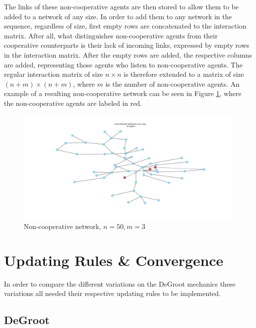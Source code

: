 \documentclass[a4paper, 12pt]{report}
\begin{document}
\noindent The links of these non-cooperative agents are then stored to allow them to be added to a network of any size. In order to add them to any network in the sequence, regardless of size, first empty rows are concatenated to the interaction matrix. After all, what distinguishes non-cooperative agents from their cooperative counterparts is their lack of incoming links, expressed by empty rows in the interaction matrix. After the empty rows are added, the respective columns are added, representing those agents who listen to non-cooperative agents. The regular interaction matrix of size $n \times n$ is therefore extended to a matrix of size $(n+m) \times (n+m)$, where $m$ is the number of non-cooperative agents.
An example of a resulting non-cooperative network can be seen in Figure \ref{network:noncoop}, where the non-cooperative agents are labeled in red.

\begin{center}
    \begin{figure}[!htbp]
        \centering
        \includegraphics[width=1\textwidth]{ThesisKI/Images/NonCoopGraph.png}
        \caption{Non-cooperative network, $n=50, m=3$}
        \label{network:noncoop}
    \end{figure}
\end{center}


\newpage


\section{Updating Rules \& Convergence}

In order to compare the different variations on the DeGroot mechanics these variations all needed their respective updating rules to be implemented.

\subsection{DeGroot}
\end{document}
